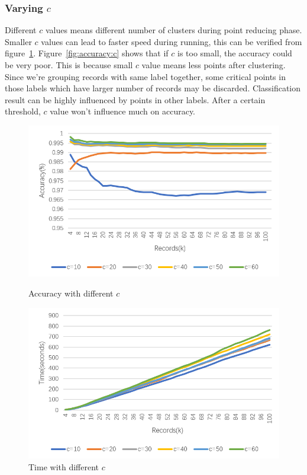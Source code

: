 \documentclass[runningheads]{llncs}
\begin{document}
	\subsubsection{Varying $c$}
	Different $c$ values means different number of clusters during point reducing phase. Smaller $c$ values can lead to faster speed during running, this can be verified from figure~\ref{fig:time:c}. Figure~\ref{fig:accuracy:c} shows that if $c$ is too small, the accuracy could be very poor. This is because small $c$ value means less points after clustering. Since we're grouping records with same label together, some critical points in those labels which have larger number of records may be discarded. Classification result can be highly influenced by points in other labels. After a certain threshold, $c$ value won't influence much on accuracy.
	\begin{figure}
		\centering
		\begin{minipage}[t]{0.46\textwidth}
			\centering
			\includegraphics[width=1.0\textwidth]{figure-c-accuracy}
			\caption{Accuracy with different $c$}
			\label{fig:accuracy:c}
		\end{minipage}
		\hspace{3mm}
		\begin{minipage}[t]{0.46\textwidth}
			\centering
			\includegraphics[width=1.0\textwidth]{figure-c-time}
			\caption{Time with different $c$}
			\label{fig:time:c}
		\end{minipage}%
	\end{figure}
\end{document}
